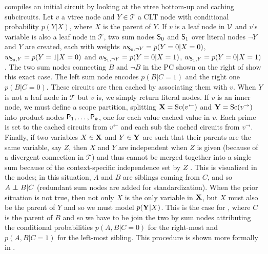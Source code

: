  compiles an initial circuit by looking at the vtree bottom-up and caching
subcircuits. Let $v$ a vtree
node and $Y\in\mathcal{T}$ a CLT node with conditional probability $p(Y|X)$, where $X$ is the
parent of $Y$. If $v$ is a leaf node in $\operatorname{\mathcal{V}}$ and $v$'s variable is also a leaf node in
$\mathcal{T}$, two sum nodes $\operatorname{\textsf{S}}_0$ and $\operatorname{\textsf{S}}_1$ over literal nodes $\neg Y$ and $Y$ are created,
each with weights $w_{\operatorname{\textsf{S}}_0,\neg Y}=p(Y=0|X=0)$, $w_{\operatorname{\textsf{S}}_0,Y}=p(Y=1|X=0)$ and $w_{\operatorname{\textsf{S}}_1,\neg
Y}=p(Y=0|X=1)$, $w_{\operatorname{\textsf{S}}_1,Y}=p(Y=0|X=1)$. The two sum nodes connecting $B$ and $\neg B$ in the PC
shown on the right of  show this exact case. The left sum node encodes $p(B|C=1)$
and the right one $p(B|C=0)$. These circuits are then cached by associating them with $v$. When $Y$
is not a leaf node in $\mathcal{T}$ but $v$ is, we simply return literal nodes. If $v$ is an inner
node, we must define a scope partition, splitting $\mathbf{X}=\operatorname*{\normalfont{Sc}}(v^\gets)$ and
$\mathbf{Y}=\operatorname*{\normalfont{Sc}}(v^\to)$ into product nodes $\operatorname{\textsf{P}}_1,\ldots,\operatorname{\textsf{P}}_k$, one for each value cached value
in $v$. Each prime is set to the cached circuits from $v^\gets$ and each sub the cached circuits
from $v^\to$. Finally, if two variables $X\in\mathbf{X}$ and $Y\in\mathbf{Y}$ are such that their parents
are the same variable, say $Z$, then $X$ and $Y$ are independent when $Z$ is given (because of a
divergent connection in $\mathcal{T}$) and thus cannot be merged together into a single sum because
of the context-specific independence set by $Z$ \citep{boutilier96}. This is visualized in the
\inode[fill=boxpink!50]{\newProdNode} nodes; in this situation, $A$ and $B$ are siblings coming
from $C$, and so $A\indep B|C$ (redundant sum nodes are added for standardization).
When the prior situation is not true, then not only $X$ is the only variable in $\mathbf{X}$, but $X$
must also be the parent of $Y$ and so we must model $p(\mathbf{Y}|X)$. This is the case for
\inode[fill=boxblue!50]{\newProdNode}, where $C$ is the parent of $B$ and so we have to be join the
two by sum nodes attributing the conditional probabilities $p(A,B|C=0)$ for the right-most
\inode[fill=boxblue!50]{\newProdNode} and $p(A,B|C=1)$ for the left-most sibling. This procedure is
shown more formally in .


